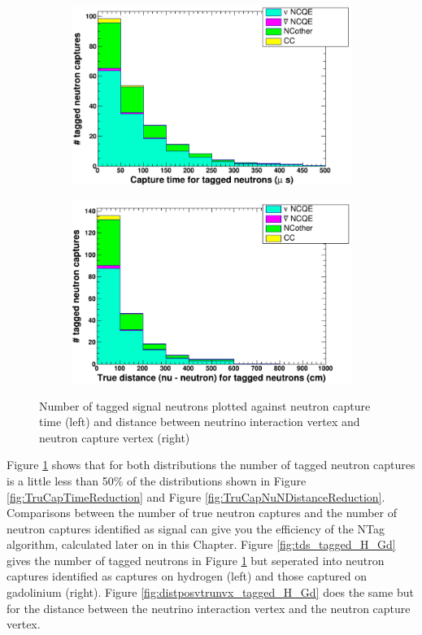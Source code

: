 \begin{figure}
    \centering
     \begin{subfigure}[b]{0.49\linewidth}
      \includegraphics[width=\linewidth]{Figures/tds_tagged_neutrons.PNG}
     \end{subfigure}
     \begin{subfigure}[b]{0.49\linewidth}
       \includegraphics[width=\linewidth]{Figures/distposvtrunvcx_tagged_neutrons.PNG}
      \end{subfigure} 
      \caption{Number of tagged signal neutrons plotted against neutron capture time (left) and distance between neutrino interaction vertex and neutron capture vertex (right)}
      \label{fig:tagged_neutrons_plot} 
\end{figure}

Figure \ref{fig:tagged_neutrons_plot} shows that for both distributions the number of tagged neutron captures is a little less than 50\% of the distributions shown in Figure \ref{fig:TruCapTimeReduction} and Figure \ref{fig:TruCapNuNDistanceReduction}. Comparisons between the number of true neutron captures and the number of neutron captures identified as signal can give you the efficiency of the NTag algorithm, calculated later on in this Chapter. Figure \ref{fig:tds_tagged_H_Gd} gives the number of tagged neutrons in Figure \ref{fig:tagged_neutrons_plot} but seperated into neutron captures identified as captures on hydrogen (left) and those captured on gadolinium (right). Figure \ref{fig:distposvtrunvx_tagged_H_Gd} does the same but for the distance between the neutrino interaction vertex and the neutron capture vertex.

